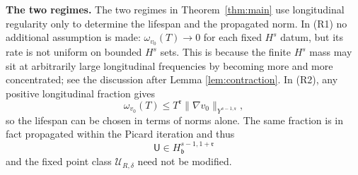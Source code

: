 \documentclass[11pt,reqno]{amsart}
\theoremstyle{plain}
\theoremstyle{definition}
\theoremstyle{remark}
\numberwithin{equation}{section}
\newcommand{\breg}{\mathfrak b}
\newcommand{\rpar}{\mathfrak r}
\newcommand{\Ufield}{\mathsf U}
\begin{document}
\textbf{The two regimes.}
The two regimes in Theorem~\ref{thm:main} use longitudinal regularity only to
determine the lifespan and the propagated norm. In \textup{(R1)} no additional assumption is made:
$\omega_{v_0}(T)\to0$ for each fixed $H^s$ datum, but its rate is not uniform
on bounded $H^s$ sets. This is because the finite $H^s$ mass may sit at arbitrarily large longitudinal frequencies by becoming more and more concentrated; see the discussion after Lemma \ref{lem:contraction}.
In \textup{(R2)}, any positive longitudinal fraction gives
\[
 \omega_{v_0}(T)
 \le
 T^{\rpar}\|\nabla v_0\|_{Y^{s-1,\rpar}},
\]
so the lifespan can be chosen in terms of norms alone. The same fraction is in fact propagated within the Picard iteration and thus
\[
 \Ufield\in H_{\breg}^{s-1,1+\rpar}
\]
and the fixed point class $\mathcal{U}_{R,\delta}$ need not be modified.\\
\end{document}
